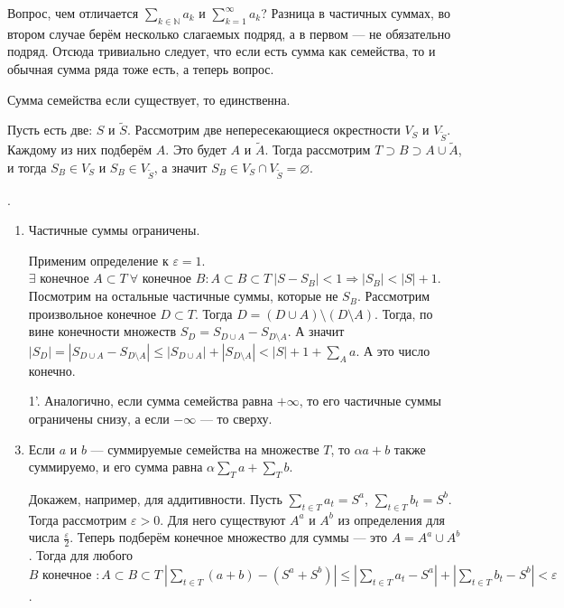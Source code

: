\documentclass{article}
\begin{document}
\begin{itemize}
\begin{Comment}
            Вопрос, чем отличается $\sum\limits_{k\in\mathbb N}a_k$ и $\sum\limits_{k=1}^\infty a_k$? Разница в частичных суммах, во втором случае берём несколько слагаемых подряд, а в первом --- не обязательно подряд. Отсюда тривиально следует, что если есть сумма как семейства, то и обычная сумма ряда тоже есть, а теперь вопрос.
        \end{Comment}
        \thm Сумма семейства если существует, то единственна.
        \begin{Proof}
            Пусть есть две: $S$ и $\tilde S$. Рассмотрим две непересекающиеся окрестности $V_S$ и $V_{\tilde S}$. Каждому из них подберём $A$. Это будет $A$ и $\tilde A$. Тогда рассмотрим $T\supset B\supset A\cup\tilde A$, и тогда $S_B\in V_S$ и $S_B\in V_{\tilde S}$, а значит $S_B\in V_S\cap V_{\tilde S}=\varnothing$.
        \end{Proof}
        \thm {}.
        \begin{enumerate}[1.]
            \item Частичные суммы ограничены.
            \begin{Proof}
                Применим определение к $\varepsilon=1$. $\exists\text{ конечное }A\subset T~\forall\text{ конечное }B:A\subset B\subset T~\left|S-S_B\right|<1\Longrightarrow|S_B|<|S|+1$. Посмотрим на остальные частичные суммы, которые не $S_B$. Рассмотрим произвольное конечное $D\subset T$. Тогда $D=(D\cup A)\setminus(D\setminus A)$. Тогда, по вине конечности множеств $S_D=S_{D\cup A}-S_{D\setminus A}$. А значит $|S_D|=|S_{D\cup A}-S_{D\setminus A}|\leqslant|S_{D\cup A}|+|S_{D\setminus A}|<|S|+1+\sum\limits_Aa$. А это число конечно.
            \end{Proof}
            \item[1'.] Аналогично, если сумма семейства равна $+\infty$, то его частичные суммы ограничены снизу, а если $-\infty$ --- то сверху.
            \item Если $a$ и $b$ --- суммируемые семейства на множестве $T$, то $\alpha a+b$ также суммируемо, и его сумма равна $\alpha\sum\limits_Ta+\sum\limits_Tb$.
            \begin{Proof}
                Докажем, например, для аддитивности. Пусть $\sum\limits_{t\in T} a_t=S^a$, $\sum\limits_{t\in T} b_t=S^b$. Тогда рассмотрим $\varepsilon>0$. Для него существуют $A^a$ и $A^b$ из определения для числа $\frac\varepsilon2$. Теперь подберём конечное множество для суммы --- это $A=A^a\cup A^b$. Тогда для любого $B\text{ конечное }:A\subset B\subset T~|\sum\limits_{t\in T}(a+b)-(S^a+S^b)|\leqslant|\sum\limits_{t\in T}a_t-S^a|+|\sum\limits_{t\in T}b_t-S^b|<\varepsilon$.\\

\end{Proof}
\end{enumerate}
\end{itemize}
\end{document}
